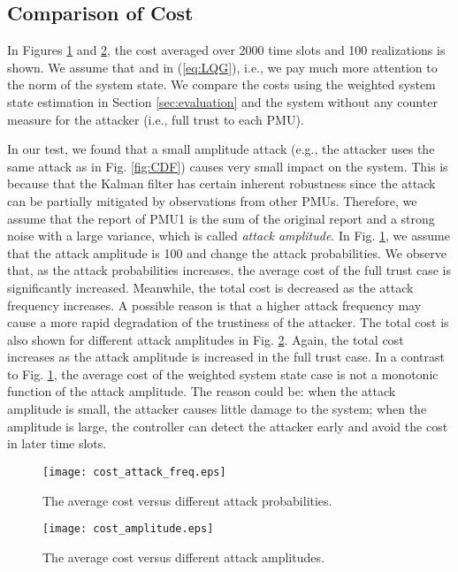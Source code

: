 \documentclass[journal,10pt,twocolumn]{IEEEtran}
\begin{document}
\subsection{Comparison of Cost}
In Figures \ref{fig:cost1} and \ref{fig:cost2}, the cost averaged over 2000 time slots and 100 realizations is shown. We assume that  and  in (\ref{eq:LQG}), i.e., we pay much more attention to the norm of the system state. We compare the costs using the weighted system state estimation in Section \ref{sec:evaluation} and the system without any counter measure for the attacker (i.e., full trust to each PMU).

In our test, we found that a small amplitude attack (e.g., the attacker uses the same attack as in Fig. \ref{fig:CDF}) causes very small impact on the system. This is because that the Kalman filter has certain inherent robustness since the attack can be partially mitigated by observations from other PMUs. Therefore, we assume that the report of PMU1 is the sum of the original report and a strong noise with a large variance, which is called {\em attack amplitude}. In Fig. \ref{fig:cost1}, we assume that the attack amplitude is 100 and change the attack probabilities. We observe that, as the attack probabilities increases, the average cost of the full trust case is significantly increased. Meanwhile, the total cost is decreased as the attack frequency increases. A possible reason is that a higher attack frequency may cause a more rapid degradation of the trustiness of the attacker. The total cost is also shown for different attack amplitudes in Fig. \ref{fig:cost2}. Again, the total cost increases as the attack amplitude is increased in the full trust case. In a contrast to Fig. \ref{fig:cost1}, the average cost of the weighted system state case is not a monotonic function of the attack amplitude. The reason could be: when the attack amplitude is small, the attacker causes little damage to the system; when the amplitude is large, the controller can detect the attacker early and avoid the cost in later time slots.

\begin{figure}
  \centering
  \texttt{[image: cost\_attack\_freq.eps]}
  \caption{The average cost versus different attack probabilities.}\label{fig:cost1}
\end{figure}

\begin{figure}
  \centering
  \texttt{[image: cost\_amplitude.eps]}
  \caption{The average cost versus different attack amplitudes.}\label{fig:cost2}
\end{figure}
\end{document}
